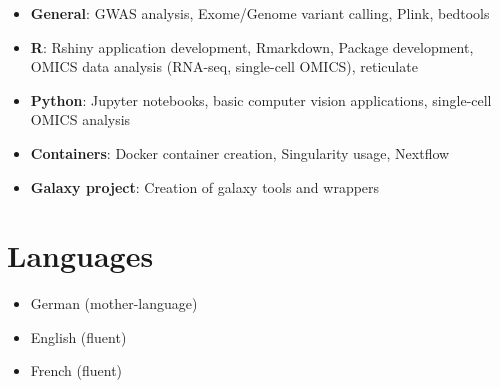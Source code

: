 \documentclass[11pt,a4paper,]{awesome-cv}
\providecommand{\tightlist}{%
	\setlength{\itemsep}{0pt}\setlength{\parskip}{0pt}}
\begin{document}
\begin{itemize}
\tightlist
\item
  \textbf{General}: GWAS analysis, Exome/Genome variant calling, Plink,
  bedtools
\item
  \textbf{R}: Rshiny application development, Rmarkdown, Package
  development, OMICS data analysis (RNA-seq, single-cell OMICS),
  reticulate
\item
  \textbf{Python}: Jupyter notebooks, basic computer vision
  applications, single-cell OMICS analysis
\item
  \textbf{Containers}: Docker container creation, Singularity usage,
  Nextflow
\item
  \textbf{Galaxy project}: Creation of galaxy tools and wrappers
\end{itemize}

\hypertarget{languages}{%
\section{\texorpdfstring{
Languages}{ Languages}}\label{languages}}

\begin{itemize}
\tightlist
\item
  German (mother-language)
\item
  English (fluent)
\item
  French (fluent)
\end{itemize}
\end{document}

